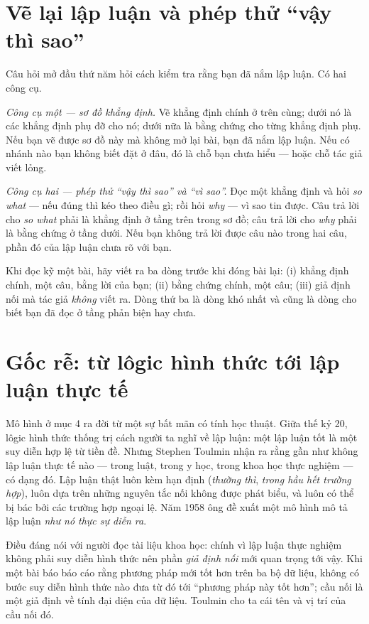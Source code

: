 \documentclass[../../english.tex]{subfiles}
\begin{document}
\section{Vẽ lại lập luận và phép thử ``vậy thì sao''}

Câu hỏi mở đầu thứ năm hỏi cách kiểm tra rằng bạn đã nắm lập luận. Có hai công cụ.

\emph{Công cụ một --- sơ đồ khẳng định.} Vẽ khẳng định chính ở trên cùng; dưới nó là các khẳng định phụ đỡ cho nó; dưới nữa là bằng chứng cho từng khẳng định phụ. Nếu bạn vẽ được sơ đồ này mà không mở lại bài, bạn đã nắm lập luận. Nếu có nhánh nào bạn không biết đặt ở đâu, đó là chỗ bạn chưa hiểu --- hoặc chỗ tác giả viết lỏng.

\emph{Công cụ hai --- phép thử ``vậy thì sao'' và ``vì sao''.} Đọc một khẳng định và hỏi \emph{so what} --- nếu đúng thì kéo theo điều gì; rồi hỏi \emph{why} --- vì sao tin được. Câu trả lời cho \emph{so what} phải là khẳng định ở tầng trên trong sơ đồ; câu trả lời cho \emph{why} phải là bằng chứng ở tầng dưới. Nếu bạn không trả lời được câu nào trong hai câu, phần đó của lập luận chưa rõ với bạn.

\begin{cannho}
Khi đọc kỹ một bài, hãy viết ra ba dòng trước khi đóng bài lại: (i) khẳng định chính, một câu, bằng lời của bạn; (ii) bằng chứng chính, một câu; (iii) giả định nối mà tác giả \emph{không} viết ra. Dòng thứ ba là dòng khó nhất và cũng là dòng cho biết bạn đã đọc ở tầng phản biện hay chưa.
\end{cannho}

\section{Gốc rễ: từ lôgic hình thức tới lập luận thực tế}

Mô hình ở mục 4 ra đời từ một sự bất mãn có tính học thuật. Giữa thế kỷ 20, lôgic hình thức thống trị cách người ta nghĩ về lập luận: một lập luận tốt là một suy diễn hợp lệ từ tiền đề. Nhưng Stephen Toulmin nhận ra rằng gần như không lập luận thực tế nào --- trong luật, trong y học, trong khoa học thực nghiệm --- có dạng đó. Lập luận thật luôn kèm hạn định (\emph{thường thì}, \emph{trong hầu hết trường hợp}), luôn dựa trên những nguyên tắc nối không được phát biểu, và luôn có thể bị bác bởi các trường hợp ngoại lệ. Năm 1958 ông đề xuất một mô hình mô tả lập luận \emph{như nó thực sự diễn ra}\cite{toulmin1958}.

Điều đáng nói với người đọc tài liệu khoa học: chính vì lập luận thực nghiệm không phải suy diễn hình thức nên phần \emph{giả định nối} mới quan trọng tới vậy. Khi một bài báo báo cáo rằng phương pháp mới tốt hơn trên ba bộ dữ liệu, không có bước suy diễn hình thức nào đưa từ đó tới ``phương pháp này tốt hơn''; cầu nối là một giả định về tính đại diện của dữ liệu. Toulmin cho ta cái tên và vị trí của cầu nối đó.
\end{document}
